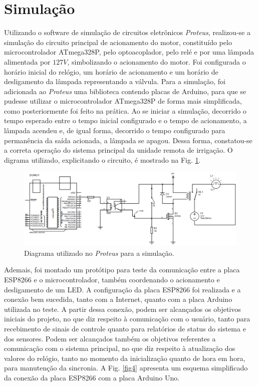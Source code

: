 \documentclass[conference]{IEEEtran}
\begin{document}
\section{Simulação}

Utilizando o software de simulação de circuitos eletrônicos \textit{Proteus}, realizou-se a simulação do circuito principal de acionamento do motor, constituído pelo microcontrolador ATmega328P, pelo optoacoplador, pelo relé e por uma lâmpada alimentada por $127 V$, simbolizando o acionamento do motor. Foi configurada o horário inicial do relógio, um horário de acionamento e um horário de desligamento da lâmpada representando a válvula. Para a simulação, foi adicionada ao \textit{Proteus} uma biblioteca contendo placas de Arduino, para que se pudesse utilizar o microcontrolador ATmega328P de forma mais simplificada, como posteriormente foi feito na prática. Ao se iniciar a simulação, decorrido o tempo esperado entre o tempo inicial configurado e o tempo de acionamento, a lâmpada acendeu e, de igual forma, decorrido o tempo configurado para permanência da saída acionada, a lâmpada se apagou. Dessa forma, constatou-se a correta operação do sistema principal da unidade remota de irrigação. O digrama utilizado, explicitando o circuito, é mostrado na Fig. \ref{fig3}.

\begin{figure}[htbp]
\centerline{\includegraphics[angle=0, scale=.2]{Img3.png}}
\caption{Diagrama utilizado no \textit{Proteus} para a simulação.}
\label{fig3}
\end{figure}

Ademais, foi montado um protótipo para teste da comunicação entre a placa ESP8266 e o microcontrolador, também coordenando o acionamento e desligamento de um LED. A configuração da placa ESP8266 foi realizada e a conexão bem sucedida, tanto com a Internet, quanto com a placa Arduino utilizada no teste. A partir dessa conexão, podem ser alcançados os objetivos iniciais do projeto, no que diz respeito à comunicação com o usuário, tanto para recebimento de sinais de controle quanto para relatórios de status do sistema e dos sensores. Podem ser alcançados também os objetivos referentes a comunicação com o sistema principal, no que diz respeito à atualização dos valores do relógio, tanto no momento da inicialização quanto de hora em hora, para manutenção da sincronia. A Fig. \ref{fig4} apresenta um esquema simplificado da conexão da placa ESP8266 com a placa Arduino Uno.
\end{document}
